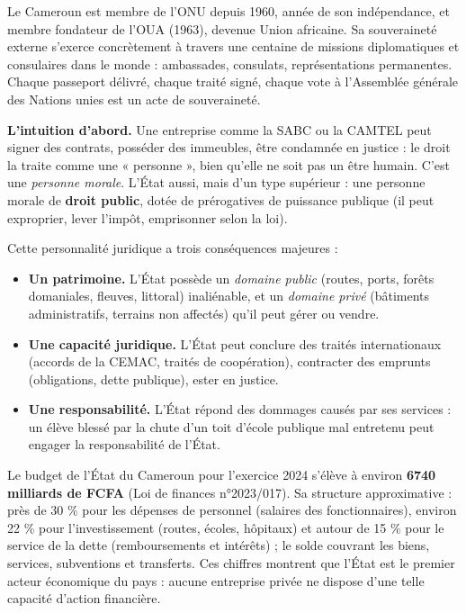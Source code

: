 \documentclass[11pt]{article}
\newcounter{popsec}
\newcounter{popsub}
\newcommand{\courssub}[1]{%
  \stepcounter{popsub}%
  \par\vspace{9pt}\noindent{\popxbold\fontsize{11.5}{13}\selectfont\color{popink}{\color{poporange}\thepopsec.\thepopsub}\hspace{6pt}#1}\par\nopagebreak\vspace{4pt}
}
\begin{document}
\begin{savaistu}
Le Cameroun est membre de l'ONU depuis 1960, année de son indépendance, et membre fondateur de l'OUA (1963), devenue Union africaine. Sa souveraineté externe s'exerce concrètement à travers une centaine de missions diplomatiques et consulaires dans le monde : ambassades, consulats, représentations permanentes. Chaque passeport délivré, chaque traité signé, chaque vote à l'Assemblée générale des Nations unies est un acte de souveraineté.
\end{savaistu}

\courssub{L'État, personne morale de droit public}

\textbf{L'intuition d'abord.} Une entreprise comme la SABC ou la CAMTEL peut signer des contrats, posséder des immeubles, être condamnée en justice : le droit la traite comme une « personne », bien qu'elle ne soit pas un être humain. C'est une \emph{personne morale}. L'État aussi, mais d'un type supérieur : une personne morale de \textbf{droit public}, dotée de prérogatives de puissance publique (il peut exproprier, lever l'impôt, emprisonner selon la loi).

Cette personnalité juridique a trois conséquences majeures :

\begin{itemize}
\item \textbf{Un patrimoine.} L'État possède un \emph{domaine public} (routes, ports, forêts domaniales, fleuves, littoral) inaliénable, et un \emph{domaine privé} (bâtiments administratifs, terrains non affectés) qu'il peut gérer ou vendre.
\item \textbf{Une capacité juridique.} L'État peut conclure des traités internationaux (accords de la CEMAC, traités de coopération), contracter des emprunts (obligations, dette publique), ester en justice.
\item \textbf{Une responsabilité.} L'État répond des dommages causés par ses services : un élève blessé par la chute d'un toit d'école publique mal entretenu peut engager la responsabilité de l'État.
\end{itemize}

\begin{exemplebox}
Le budget de l'État du Cameroun pour l'exercice 2024 s'élève à environ \textbf{\num{6740} milliards de FCFA} (Loi de finances n°2023/017). Sa structure approximative : près de 30 \% pour les dépenses de personnel (salaires des fonctionnaires), environ 22 \% pour l'investissement (routes, écoles, hôpitaux) et autour de 15 \% pour le service de la dette (remboursements et intérêts) ; le solde couvrant les biens, services, subventions et transferts. Ces chiffres montrent que l'État est le premier acteur économique du pays : aucune entreprise privée ne dispose d'une telle capacité d'action financière.
\end{exemplebox}
\end{document}
